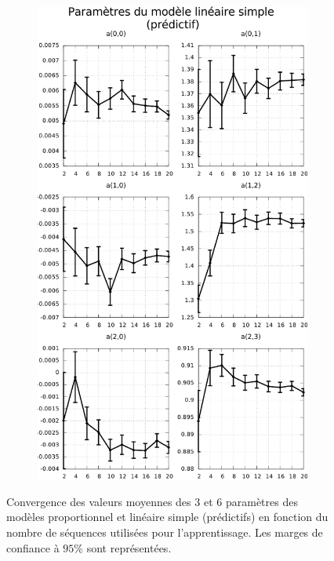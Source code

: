 \begin{figure}[htb]
\begin{subfigure}{0.4\paperwidth}
        \includegraphics[type=pdf,ext=.pdf,read=.pdf,width=0.9\linewidth]{../plot/OdometryCMAES/parametersSimpleOrders}
    \end{subfigure}
    \caption{\label{fig:odometry_cmaes_parameters_prop_simple_orders} 
        Convergence des valeurs moyennes des $3$ et $6$ paramètres des modèles proportionnel 
        et linéaire simple (prédictifs) en fonction du nombre de séquences utilisées pour l'apprentissage.
        Les marges de confiance à $95\%$ sont représentées.
    }
\end{figure}
